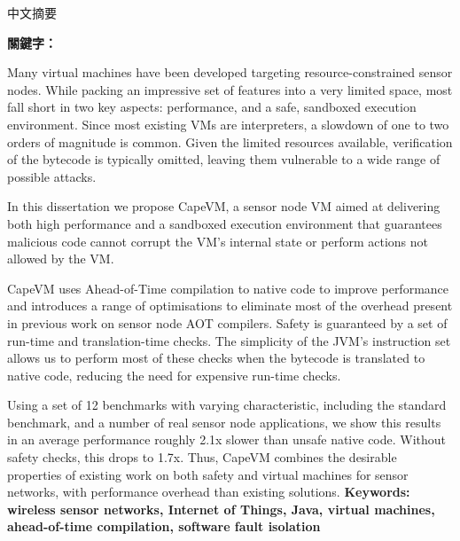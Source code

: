 \begin{abstractzh}
中文摘要

\bigbreak
\noindent \textbf{關鍵字：}{\, \makeatletter \@keywordszh \makeatother}
\end{abstractzh}

\begin{abstracten}
Many virtual machines have been developed targeting resource-constrained sensor nodes. While packing an impressive set of features into a very limited space, most fall short in two key aspects: performance, and a safe, sandboxed execution environment. Since most existing VMs are interpreters, a slowdown of one to two orders of magnitude is common. Given the limited resources available, verification of the bytecode is typically omitted, leaving them vulnerable to a wide range of possible attacks.

In this dissertation we propose CapeVM, a sensor node VM aimed at delivering both high performance and a sandboxed execution environment that guarantees malicious code cannot corrupt the VM's internal state or perform actions not allowed by the VM.

CapeVM uses Ahead-of-Time compilation to native code to improve performance and introduces a range of optimisations to eliminate most of the overhead present in previous work on sensor node AOT compilers. Safety is guaranteed by a set of run-time and translation-time checks. The simplicity of the JVM's instruction set allows us to perform most of these checks when the bytecode is translated to native code, reducing the need for expensive run-time checks.

Using a set of 12 benchmarks with varying characteristic, including the standard  benchmark, and a number of real sensor node applications, we show this results in an average performance roughly 2.1x slower than unsafe native code. Without safety checks, this drops to 1.7x. Thus, CapeVM combines the desirable properties of existing work on both safety and virtual machines for sensor networks, with performance overhead than existing solutions.
\bigbreak
\noindent \textbf{Keywords: wireless sensor networks, Internet of Things, Java, virtual machines, ahead-of-time compilation, software fault isolation}{\, \makeatletter \@keywordsen \makeatother}
\end{abstracten}

\begin{comment}


\end{comment}
